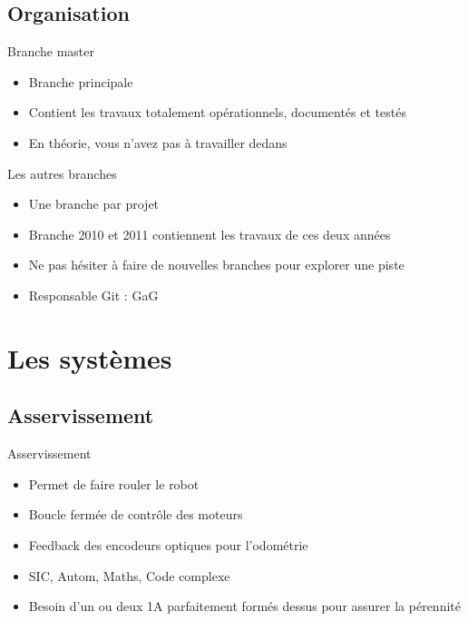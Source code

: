 \documentclass{beamer}
\begin{document}
\subsection{Organisation}
\begin{frame}{Branche master}
	\begin{itemize}
		\item Branche principale
		\item Contient les travaux totalement opérationnels, documentés et testés
		\item En théorie, vous n'avez pas à travailler dedans
	\end{itemize}
\end{frame}

\begin{frame}{Les autres branches}
	\begin{itemize}
		\item Une branche par projet
		\item Branche 2010 et 2011 contiennent les travaux de ces deux années
		\item Ne pas hésiter à faire de nouvelles branches pour explorer une piste
		\item Responsable Git : GaG
	\end{itemize}
\end{frame}

\section{Les systèmes}
\subsection{Asservissement}
\begin{frame}{Asservissement}
	\begin{itemize}
		\item Permet de faire rouler le robot
		\item Boucle fermée de contrôle des moteurs
		\item Feedback des encodeurs optiques pour l'odométrie
		\item SIC, Autom, Maths, Code complexe
		\item Besoin d'un ou deux 1A parfaitement formés dessus pour assurer la pérennité
	\end{itemize}
\end{frame}
\end{document}
